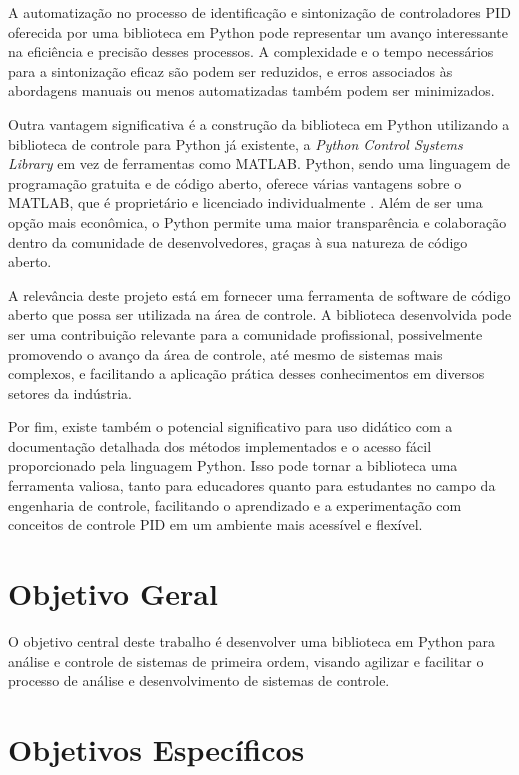 A automatização no processo de identificação e sintonização de controladores PID oferecida por uma biblioteca em Python
pode representar um avanço interessante na eficiência e precisão desses processos.
A complexidade e o tempo necessários para a sintonização eficaz são podem ser reduzidos, e erros
associados às abordagens manuais ou menos automatizadas também podem ser minimizados.

Outra vantagem significativa é a construção da biblioteca em Python utilizando a biblioteca de
controle para Python já existente, a \textit{Python Control Systems Library} em vez de ferramentas como MATLAB.
Python, sendo uma linguagem de programação gratuita e de código aberto, oferece várias vantagens sobre o MATLAB, que é
proprietário e licenciado individualmente \cite{introart3}.
Além de ser uma opção mais econômica, o Python permite uma maior transparência e colaboração dentro da comunidade de
desenvolvedores, graças à sua natureza de código aberto.

A relevância deste projeto está em fornecer uma ferramenta de software de código aberto que possa ser utilizada na área
de controle.
A biblioteca desenvolvida pode ser uma contribuição relevante para a comunidade profissional, possivelmente promovendo
o avanço da área de controle, até mesmo de sistemas mais complexos, e facilitando a aplicação prática desses
conhecimentos em diversos setores da indústria.

Por fim, existe também o potencial significativo para uso didático com a documentação detalhada dos métodos
implementados e o acesso fácil proporcionado pela linguagem Python.
Isso pode tornar a biblioteca uma ferramenta valiosa, tanto para educadores quanto para estudantes no campo da
engenharia de controle, facilitando o aprendizado e a experimentação com conceitos de controle PID em um ambiente mais
acessível e flexível.

\section{Objetivo Geral}

O objetivo central deste trabalho é desenvolver uma biblioteca em Python para análise
e controle de sistemas de primeira ordem, visando agilizar e facilitar o processo de
análise e desenvolvimento de sistemas de controle.

\section{Objetivos Específicos}

